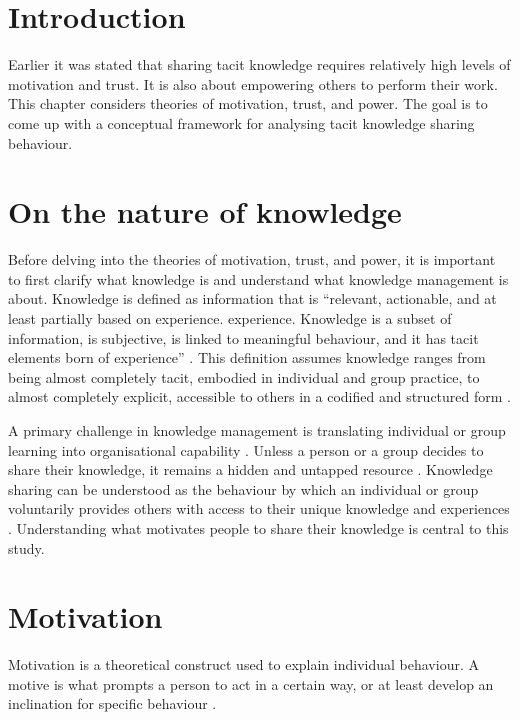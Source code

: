
\section{Introduction}

Earlier it was stated that sharing tacit knowledge requires relatively high levels of motivation and trust. It is also about empowering others to perform their work. This chapter considers theories of motivation, trust, and power. The goal is to come up with a conceptual framework for analysing tacit knowledge sharing behaviour.

\section{On the nature of knowledge}

Before delving into the theories of motivation, trust, and power, it is important to first clarify what knowledge is and understand what knowledge management is about. Knowledge is defined as information that is \enquote{relevant, actionable, and at least partially based on experience. experience. Knowledge is a subset of information, is subjective, is linked to meaningful behaviour, and it has tacit elements born of experience} \citep{leonard1998role}. This definition assumes knowledge ranges from being almost completely tacit, embodied in individual and group practice, to almost completely explicit, accessible to others in a codified and structured form \citep{polanyi1966tacit,nelson1982evolutionary,inkpen1998knowledge,leonard1998role,munoz2015tacit}. \medskip

A primary challenge in knowledge management is translating individual or group learning into organisational capability \citep{hansen2005share,lam2010knowledge,girard2015defining}. Unless a person or a group decides to share their knowledge, it remains a hidden and untapped resource \citep{davenport1998working}. Knowledge sharing can be understood as the behaviour by which an individual or group voluntarily provides others with access to their unique knowledge and experiences \citep{cabrera2002knowledge,hansen2005share}. Understanding what motivates people to share their knowledge is central to this study. \medskip

\section{Motivation}

Motivation is a theoretical construct used to explain individual behaviour. A motive is what prompts a person to act in a certain way, or at least develop an inclination for specific behaviour \citep{pardee1990motivation}. \medskip

